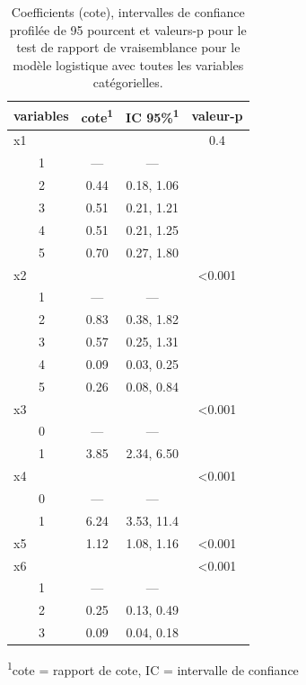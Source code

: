 \documentclass[
  11pt,
  letterpaper,
]{scrbook}
\theoremstyle{definition}
\theoremstyle{remark}
\begin{document}
\hypertarget{tbl-logit1-complet}{}
\setlength{\LTpost}{0mm}
\begin{longtable}{lccc}
\caption{\label{tbl-logit1-complet}Coefficients (cote), intervalles de confiance profilée de 95 pourcent et
valeurs-p pour le test de rapport de vraisemblance pour le modèle
logistique avec toutes les variables catégorielles. }\tabularnewline

\toprule
variables & cote\textsuperscript{1} & IC 95\%\textsuperscript{1} & valeur-p \\ 
\midrule
x1 &  &  & 0.4 \\ 
    1 & — & — &  \\ 
    2 & 0.44 & 0.18, 1.06 &  \\ 
    3 & 0.51 & 0.21, 1.21 &  \\ 
    4 & 0.51 & 0.21, 1.25 &  \\ 
    5 & 0.70 & 0.27, 1.80 &  \\ 
x2 &  &  & <0.001 \\ 
    1 & — & — &  \\ 
    2 & 0.83 & 0.38, 1.82 &  \\ 
    3 & 0.57 & 0.25, 1.31 &  \\ 
    4 & 0.09 & 0.03, 0.25 &  \\ 
    5 & 0.26 & 0.08, 0.84 &  \\ 
x3 &  &  & <0.001 \\ 
    0 & — & — &  \\ 
    1 & 3.85 & 2.34, 6.50 &  \\ 
x4 &  &  & <0.001 \\ 
    0 & — & — &  \\ 
    1 & 6.24 & 3.53, 11.4 &  \\ 
x5 & 1.12 & 1.08, 1.16 & <0.001 \\ 
x6 &  &  & <0.001 \\ 
    1 & — & — &  \\ 
    2 & 0.25 & 0.13, 0.49 &  \\ 
    3 & 0.09 & 0.04, 0.18 &  \\ 
\bottomrule
\end{longtable}
\begin{minipage}{\linewidth}
\textsuperscript{1}cote = rapport de cote, IC = intervalle de confiance\\
\end{minipage}
\end{document}
